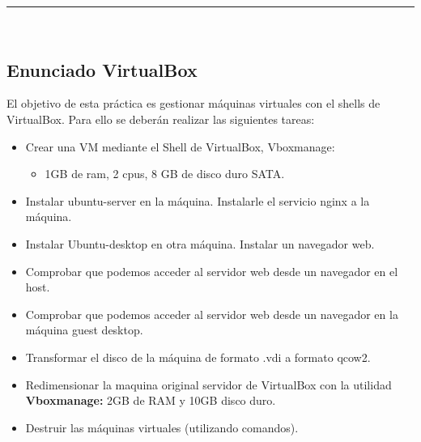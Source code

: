 \begin{center}
	{\fboxrule=4pt } \\
	\setcounter{section}{1}
	\setcounter{subsection}{0}
	\rule{15cm}{0pt} \\
\end{center}

\subsection{Enunciado VirtualBox}

\begin{ejer}
    \par El objetivo de esta práctica es gestionar máquinas virtuales con el shells de VirtualBox. 
	Para ello se deberán realizar las siguientes tareas:
	\begin{itemize}
		\item Crear una VM mediante el Shell de VirtualBox, Vboxmanage: 
		\begin{itemize}
			\item 1GB de ram, 2 cpus, 8 GB de disco duro SATA.
		\end{itemize}
		\item Instalar ubuntu-server en la máquina. Instalarle el servicio nginx a la máquina. 
		\item Instalar Ubuntu-desktop en otra máquina. Instalar un navegador web. 
		\item Comprobar que podemos acceder al servidor web desde un navegador en el host.
		\item Comprobar que podemos acceder al servidor web desde un navegador en la máquina guest desktop.
		\item Transformar el disco de la máquina de formato .vdi a formato qcow2. 
		\item Redimensionar la maquina original servidor de VirtualBox con la utilidad \textbf{Vboxmanage:} 2GB de RAM y 10GB disco duro. 
		\item Destruir las máquinas virtuales (utilizando comandos).
	\end{itemize}
\end{ejer}




